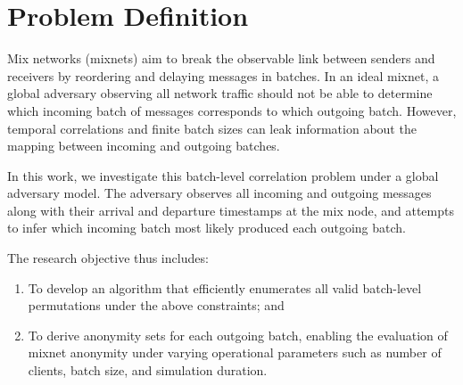 \documentclass[twocolumn]{article}
\begin{document}

\section{Problem Definition}
\label{sec:problem}

Mix networks (mixnets) aim to break the observable link between senders and receivers by reordering and delaying messages in batches. In an ideal mixnet, a global adversary observing all network traffic should not be able to determine which incoming batch of messages corresponds to which outgoing batch. However, temporal correlations and finite batch sizes can leak information about the mapping between incoming and outgoing batches.

In this work, we investigate this batch-level correlation problem under a global adversary model. The adversary observes all incoming and outgoing messages along with their arrival and departure timestamps at the mix node, and attempts to infer which incoming batch most likely produced each outgoing batch.

The research objective thus includes:

\begin{enumerate}
\item To develop an algorithm that efficiently enumerates all valid batch-level permutations under the above constraints; and

\item To derive anonymity sets for each outgoing batch, enabling the evaluation of mixnet anonymity under varying operational parameters such as number of clients, batch size, and simulation duration.
\end{enumerate}

\end{document}
